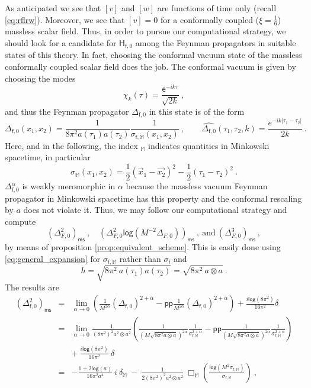 \documentclass[11pt]{book}
\newcommand{\pp}{\mathsf{pp}}
\newcommand{\ms}{\mathsf{ms}}
\renewcommand{\log}{\mathsf{log}}
\newcommand{\Mbb}{\mathbb{M}}
\newcommand{\Hsf}{\mathsf{H}}
\newcommand{\esf}{\mathsf{e}}
\newcommand{\fsf}{\mathsf{f}}
\theoremstyle{break}
\begin{document}
As anticipated we see that $[v]$ and $[w]$ are functions of time only (recall \eqref{eq:rflrw}). Moreover, we see that $[v]=0$ for a conformally coupled ($\xi=\frac16$) massless scalar field. Thus, in order to pursue our computational strategy, we should look for a candidate for $\Hsf_{\fsf,0}$ among the Feynman propagators in suitable states of this theory. In fact, choosing the conformal vacuum state of the massless conformally coupled scalar field does the job. The conformal vacuum is given by choosing the modes
%
\begin{equation*}
\chi_k(\tau) = \frac{\esf^{-ik\tau}}{\sqrt{2k}} \ , 
\end{equation*}
%
and thus the Feynman propagator $\Delta_{\fsf,0}$ in this state is of the form
%
\begin{equation}
\Delta_{\fsf,0}(x_1,x_2)=\frac{1}{8\pi^2 a(\tau_1)a(\tau_2)}\frac{1}{\sigma_{\fsf,\mathbb{M}}(x_1,x_2)} \ , \qquad 
\widehat{\Delta_{\fsf,0}}(\tau_1,\tau_2,k)=\frac{e^{-ik|\tau_1-\tau_2|}}{2k}\,.
\label{eq:propagator_conformal}
\end{equation}
%
Here, and in the following, the index $_{\Mbb}$ indicates quantities in Minkowski spacetime, in particular 
%
\begin{equation*}
\sigma_{\Mbb}(x_1,x_2) = \frac12 \left(\vec{x}_1-\vec{x_2}\right)^2 - \frac12 \left(\tau_1-\tau_2\right)^2 \ . 
\end{equation*}
%
$\Delta^\alpha_{\fsf,0}$ is weakly meromorphic in $\alpha$ because the massless vacuum Feynman propagator in Minkowski spacetime has this property and the conformal rescaling by $a$ does not violate it. Thus, we may follow our computational strategy and compute
%
\begin{equation*}
\left(\Delta^2_{F,0}\right)_\ms \ , \quad \left(\Delta^2_{F,0}\log\left(M^{-2}\Delta_{F,0}\right)\right)_\ms \ , \ \mbox{and} \ \left(\Delta^3_{F,0}\right)_\ms \ ,
\end{equation*}
%
by means of proposition \ref{prop:equivalent_scheme}. This is easily done using \eqref{eq:general_expansion} for $\sigma_{\fsf,\Mbb}$ rather than $\sigma_\fsf$ and
%
\begin{equation*}
h = \sqrt{8 \pi^2 \ a(\tau_1)a(\tau_2)} = \sqrt{8\pi^2 \  a\otimes a} \ . 
\end{equation*}
%
The results are
%
\begin{eqnarray*}
(\Delta_{\fsf,0}^2)_\ms &=& \lim_{\alpha\to 0} \left( \frac{1}{M^{2\alpha}}(\Delta_{\fsf,0})^{2+\alpha} - \pp\frac{1}{M^{2\alpha}}(\Delta_{\fsf,0})^{2+\alpha} \right) + \frac{i\log(8\pi^2)}{16\pi^2} \delta \\
&=& \lim_{\alpha\to 0} \frac{1}{(8\pi^2)^2 a^2\otimes a^2} \left(\frac{1}{(M\sqrt{8\pi^2 a\otimes a})^{2\alpha}}\frac{1}{\sigma_{\fsf,\mathbb{M}}^{2+\alpha}}-\pp \frac{1}{(M\sqrt{8\pi^2 a\otimes a})^{2\alpha}}\frac{1}{\sigma_{\fsf,\mathbb{M}}^{2+\alpha}}\right) \\
&& + \ \frac{i\log(8\pi^2)}{16\pi^2} \ \delta \\
&=& - \frac{1+2\log (a)}{16\pi^2 a^4} \ i \ \delta_\mathbb{M} \ - \ \frac{1}{2(8\pi^2)^2 a^2\otimes a^2} \ \Box_{\mathbb{M}}\left(\frac{\log\left(M^2\sigma_{\fsf,\mathbb{M}}\right)}{\sigma_{\fsf,\mathbb{M}}}\right) \ ,
\end{eqnarray*}
\end{document}
